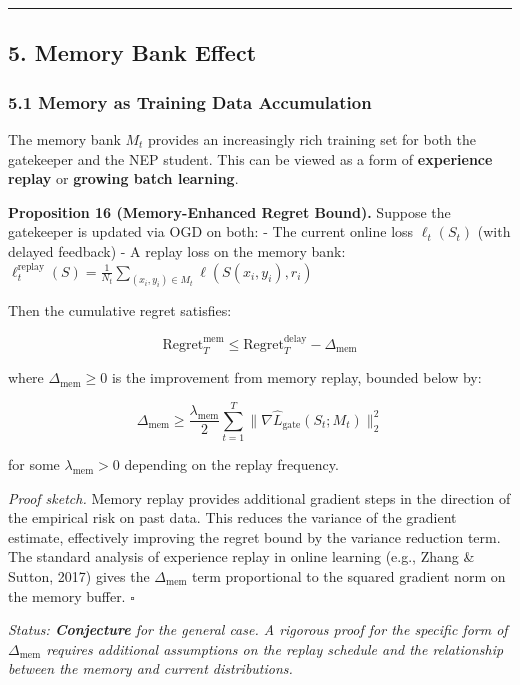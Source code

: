 \documentclass[
  12pt,
]{ctexart}
\begin{document}
\begin{center}\rule{0.5\linewidth}{0.5pt}\end{center}

\subsection{5. Memory Bank Effect}\label{memory-bank-effect}

\subsubsection{5.1 Memory as Training Data
Accumulation}\label{memory-as-training-data-accumulation}

The memory bank \(M_t\) provides an increasingly rich training set for
both the gatekeeper and the NEP student. This can be viewed as a form of
\textbf{experience replay} or \textbf{growing batch learning}.

\textbf{Proposition 16 (Memory-Enhanced Regret Bound).} Suppose the
gatekeeper is updated via OGD on both: - The current online loss
\(\ell_t(S_t)\) (with delayed feedback) - A replay loss on the memory
bank:
\(\ell_t^{\text{replay}}(S) = \frac{1}{N_t} \sum_{(x_i,y_i) \in M_t} \ell(S(x_i, y_i), r_i)\)

Then the cumulative regret satisfies:

\[\boxed{\;\text{Regret}_T^{\text{mem}} \leq \text{Regret}_T^{\text{delay}} - \Delta_{\text{mem}}\;}\]

where \(\Delta_{\text{mem}} \geq 0\) is the improvement from memory
replay, bounded below by:

\[\Delta_{\text{mem}} \geq \frac{\lambda_{\text{mem}}}{2} \sum_{t=1}^T \bigl\| \nabla \hat{L}_{\text{gate}}(S_t; M_t) \bigr\|_2^2\]

for some \(\lambda_{\text{mem}} > 0\) depending on the replay frequency.

\emph{Proof sketch.} Memory replay provides additional gradient steps in
the direction of the empirical risk on past data. This reduces the
variance of the gradient estimate, effectively improving the regret
bound by the variance reduction term. The standard analysis of
experience replay in online learning (e.g., Zhang \& Sutton, 2017) gives
the \(\Delta_{\text{mem}}\) term proportional to the squared gradient
norm on the memory buffer. \(\square\)

\emph{Status: \textbf{Conjecture} for the general case. A rigorous proof
for the specific form of \(\Delta_{\text{mem}}\) requires additional
assumptions on the replay schedule and the relationship between the
memory and current distributions.}
\end{document}
